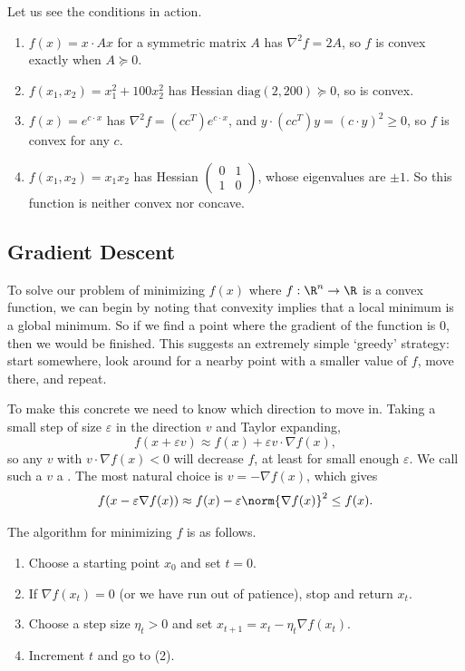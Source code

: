 \documentclass[a4paper]{scrartcl}
\begin{document}
\begin{example}
    Let us see the conditions in action.
    \begin{enumerate}[label=(\roman*)]
        \item $f(x) = x \cdot Ax$ for a symmetric matrix $A$ has $\nabla^2 f = 2A$, so $f$ is convex exactly when $A \succeq 0$.
        \item $f(x_1, x_2) = x_1^2 + 100 x_2^2$ has Hessian $\mathrm{diag}(2, 200) \succeq 0$, so is convex.
        \item $f(x) = e^{c \cdot x}$ has $\nabla^2 f = (cc^{T}) e^{c\cdot x}$, and $y \cdot (cc^T) y = (c \cdot y)^2 \geq 0$, so $f$ is convex for any $c$.
        \item $f(x_1, x_2) = x_1 x_2$ has Hessian $\begin{pmatrix} 0 & 1 \\ 1 & 0\end{pmatrix}$, whose eigenvalues are $\pm 1$. So this function is neither convex nor concave.
    \end{enumerate}
\end{example}

\subsection{Gradient Descent}

To solve our problem of minimizing $f(x)$ where $f : \R^n \rightarrow \R$ is a convex function, we can begin by noting that convexity implies that a local minimum is a global minimum. So if we find a point where the gradient of the function is $0$, then we would be finished. This suggests an extremely simple `greedy' strategy: start somewhere, look around for a nearby point with a smaller value of $f$, move there, and repeat.

To make this concrete we need to know which direction to move in. Taking a small step of size $\varepsilon$ in the direction $v$ and Taylor expanding,
$$
f(x + \varepsilon v) \approx f(x) + \varepsilon v \cdot \nabla f(x),
$$
so any $v$ with $v \cdot \nabla f(x) < 0$ will decrease $f$, at least for small enough $\varepsilon$. We call such a $v$ a . The most natural choice is $v = -\nabla f(x)$, which gives
$$
f(x - \varepsilon \nabla f(x)) \approx f(x) - \varepsilon \norm{\nabla f(x)}^2 \leq f(x).
$$

\begin{definition}
    The  algorithm for minimizing $f$ is as follows.
    \begin{enumerate}[label=(\arabic*)]
        \item Choose a starting point $x_0$ and set $t = 0$.
        \item If $\nabla f(x_t) = 0$ (or we have run out of patience), stop and return $x_t$.
        \item Choose a step size $\eta_t > 0$ and set $x_{t + 1} = x_t - \eta_t \nabla f(x_t)$.
        \item Increment $t$ and go to (2).
    \end{enumerate}
\end{definition}
\end{document}
